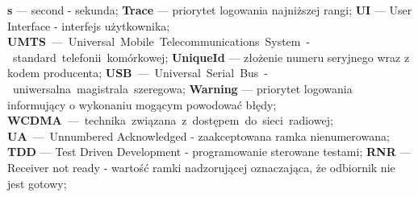 \textbf{s} --- second - sekunda;\newline
\textbf{Trace} --- priorytet logowania najniższej rangi;\newline
\textbf{UI} --- User Interface - interfejs użytkownika;\newline
\textbf{UMTS} --- Universal Mobile Telecommunications System - standard telefonii komórkowej;\newline
\textbf{UniqueId} --- złożenie numeru seryjnego wraz z kodem producenta;\newline
\textbf{USB} --- Universal Serial Bus - uniwersalna magistrala szeregowa;\newline
\textbf{Warning} --- priorytet logowania informujący o wykonaniu mogącym powodować błędy;\newline
\textbf{WCDMA} --- technika związana z dostępem do sieci radiowej;\newline
\textbf{UA} --- Unnumbered Acknowledged - zaakceptowana ramka nienumerowana;\newline
\textbf{TDD} --- Test Driven Development - programowanie sterowane testami;\newline
\textbf{RNR} --- Receiver not ready - wartość ramki nadzorującej oznaczająca, że odbiornik nie jest gotowy;\newline 
